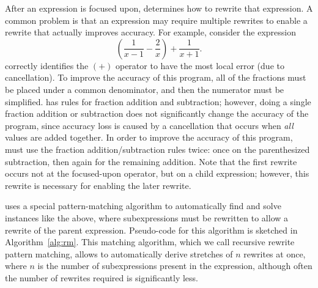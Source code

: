 \documentclass[paper.tex]{subfiles}
\begin{document}
After an expression is focused upon,
  \casio determines how to rewrite that expression.
A common problem is that an expression may require multiple rewrites
  to enable a rewrite that actually improves accuracy.
For example, consider the expression
\[
 \left(\frac{1}{x-1} - \frac{2}{x} \right) + \frac{1}{x+1}.
\]
\casio correctly identifies the $(+)$ operator
  to have the most local error (due to cancellation).
To improve the accuracy of this program,
  all of the fractions must be placed under a common denominator,
  and then the numerator must be simplified.
\casio has rules for fraction addition and subtraction;
  however, doing a single fraction addition or subtraction
  does not significantly change the accuracy of the program,
  since accuracy loss is caused by a cancellation
  that occurs when \emph{all} values are added together.
In order to improve the accuracy of this program,
  \casio must use the fraction addition/subtraction rules twice:
  once on the parenthesized subtraction,
  then again for the remaining addition.
Note that the first rewrite occurs not at the focused-upon operator,
  but on a child expression; however, this rewrite
  is necessary for enabling the later rewrite.

\casio uses a special pattern-matching algorithm
  to automatically find and solve instances like the above,
  where subexpressions must be rewritten
  to allow a rewrite of the parent expression.
Pseudo-code for this algorithm is sketched in Algorithm~\ref{alg:rm}.
This matching algorithm, which we call recursive rewrite pattern matching,
  allows \casio to automatically derive
  stretches of $n$ rewrites at once,
  where $n$ is the number of subexpressions present in the expression,
  although often the number of rewrites required is significantly less.
\end{document}
